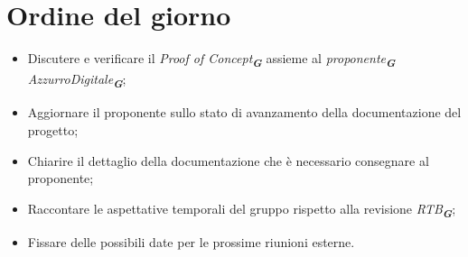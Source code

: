 

\section{Ordine del giorno}

\begin{itemize}
    \item Discutere e verificare il \emph{Proof of Concept}\textsubscript{\textbf{\textit{G}}} assieme al 
    \emph{proponente}\textsubscript{\textbf{\textit{G}}} \emph{AzzurroDigitale}\textsubscript{\textbf{\textit{G}}};
    \item Aggiornare il proponente sullo stato di avanzamento della documentazione del progetto;
    \item Chiarire il dettaglio della documentazione che è necessario consegnare al proponente;
    \item Raccontare le aspettative temporali del gruppo rispetto alla revisione \emph{RTB}\textsubscript{\textbf{\textit{G}}};
    \item Fissare delle possibili date per le prossime riunioni esterne.
\end{itemize}